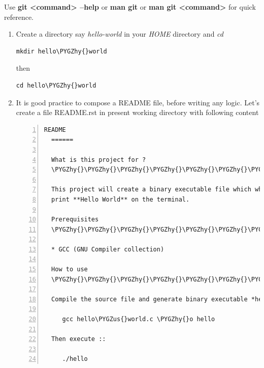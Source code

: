 \documentclass[letterpaper,10pt,english]{sphinxmanual}
\def\PYGZus{\char`\_}
\def\PYGZhy{\char`\-}
\begin{document}
Use \textbf{git \textless{}command\textgreater{} --help} or \textbf{man git} or \textbf{man git \textless{}command\textgreater{}}  for
quick reference.
\begin{enumerate}
\item {} 
Create a directory say \emph{hello-world} in your \emph{HOME} directory and \emph{cd}

\begin{Verbatim}[commandchars=\\\{\}]
mkdir hello\PYGZhy{}world
\end{Verbatim}

then

\begin{Verbatim}[commandchars=\\\{\}]
cd hello\PYGZhy{}world
\end{Verbatim}

\item {} 
It is good practice to compose a README file, before writing any logic.
Let's create a file README.rst in present working directory with following
content

\begin{Verbatim}[commandchars=\\\{\},numbers=left,firstnumber=1,stepnumber=1]
  README
  ======

  What is this project for ?
  \PYGZhy{}\PYGZhy{}\PYGZhy{}\PYGZhy{}\PYGZhy{}\PYGZhy{}\PYGZhy{}\PYGZhy{}\PYGZhy{}\PYGZhy{}\PYGZhy{}\PYGZhy{}\PYGZhy{}\PYGZhy{}\PYGZhy{}\PYGZhy{}\PYGZhy{}\PYGZhy{}\PYGZhy{}\PYGZhy{}\PYGZhy{}\PYGZhy{}\PYGZhy{}\PYGZhy{}\PYGZhy{}\PYGZhy{}

  This project will create a binary executable file which when invoked will
  print **Hello World** on the terminal.

  Prerequisites
  \PYGZhy{}\PYGZhy{}\PYGZhy{}\PYGZhy{}\PYGZhy{}\PYGZhy{}\PYGZhy{}\PYGZhy{}\PYGZhy{}\PYGZhy{}\PYGZhy{}\PYGZhy{}\PYGZhy{}

  * GCC (GNU Compiler collection)

  How to use
  \PYGZhy{}\PYGZhy{}\PYGZhy{}\PYGZhy{}\PYGZhy{}\PYGZhy{}\PYGZhy{}\PYGZhy{}\PYGZhy{}\PYGZhy{}

  Compile the source file and generate binary executable *hello* ::

     gcc hello\PYGZus{}world.c \PYGZhy{}o hello

  Then execute ::

     ./hello
\end{Verbatim}


\end{enumerate}
\end{document}
